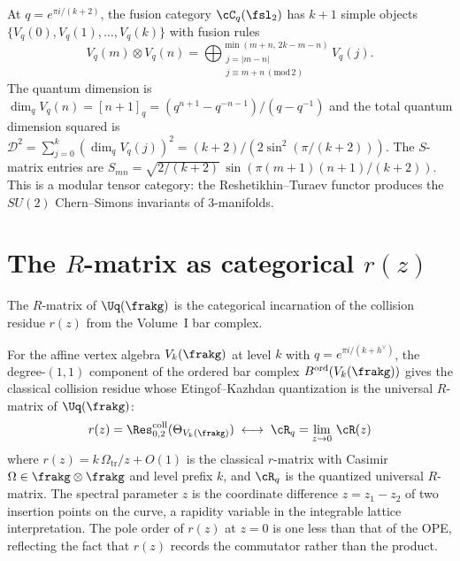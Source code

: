 \begin{example}
\label{ex:sl2-root-of-unity}
At $q = e^{\pi i/(k+2)}$, the fusion category $\cC_q(\fsl_2)$ has
$k+1$ simple objects $\{V_q(0), V_q(1), \ldots, V_q(k)\}$ with
fusion rules
\[
 V_q(m) \otimes V_q(n)
 = \bigoplus_{\substack{j = |m-n| \\ j \equiv m+n \,(\mathrm{mod}\,2)}}^{\min(m+n, \, 2k-m-n)}
 V_q(j).
\]
The quantum dimension is
$\dim_q V_q(n) = [n+1]_q = (q^{n+1} - q^{-n-1})/(q - q^{-1})$
and the total quantum dimension squared is
$\mathcal{D}^2 = \sum_{j=0}^{k} (\dim_q V_q(j))^2
= (k+2)/(2\sin^2(\pi/(k+2)))$.
The $S$-matrix entries are
$S_{mn} = \sqrt{2/(k+2)} \, \sin(\pi(m+1)(n+1)/(k+2))$.
This is a modular tensor category: the Reshetikhin--Turaev functor
produces the $SU(2)$ Chern--Simons invariants of 3-manifolds.
\end{example}


\section{The \texorpdfstring{$R$}{R}-matrix as categorical \texorpdfstring{$r(z)$}{r(z)}}
\label{sec:r-matrix-categorical}

The $R$-matrix of $\Uq(\frakg)$ is the categorical incarnation of
the collision residue $r(z)$ from the Volume~I bar complex.

\begin{proposition}
\label{prop:r-matrix-bar}
For the affine vertex algebra $V_k(\frakg)$ at level $k$ with
$q = e^{\pi i/(k+h^\vee)}$, the degree-$(1,1)$ component of the
ordered bar complex $B^{\mathrm{ord}}(V_k(\frakg))$ gives the
classical collision residue whose Etingof--Kazhdan quantization is
the universal $R$-matrix of $\Uq(\frakg)$:
\[
 r(z) = \Res^{\mathrm{coll}}_{0,2}(\Theta_{V_k(\frakg)})
 \;\longleftrightarrow\;
 \cR_q = \lim_{z \to 0}\, \cR(z)
\]
where $r(z) = k\,\Omega_{\mathrm{tr}}/z + O(1)$ is the classical $r$-matrix with
Casimir $\Omega \in \frakg \otimes \frakg$ and level prefix $k$,
and $\cR_q$ is the quantized universal $R$-matrix. The spectral
parameter $z$ is the coordinate difference $z = z_1 - z_2$ of two
insertion points on the curve, a rapidity variable in the
integrable lattice interpretation. The pole order of $r(z)$ at
$z = 0$ is one less than that of the OPE, reflecting the fact that
$r(z)$ records the commutator rather than the product.
\end{proposition}

